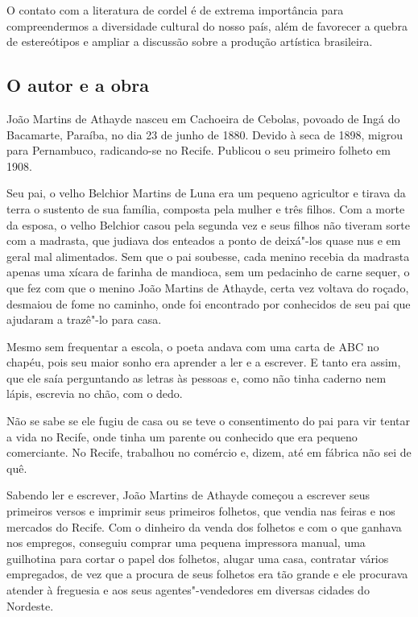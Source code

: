 \documentclass[12pt]{extarticle}
\begin{document}
O contato com a literatura de cordel é de extrema importância para
compreendermos a diversidade cultural do nosso país, além de favorecer a quebra
de estereótipos e ampliar a discussão sobre a produção artística brasileira.


\subsection{O autor e a obra}

João Martins de Athayde nasceu em Cachoeira de Cebolas, povoado de Ingá do
Bacamarte, Paraíba, no dia 23 de junho de 1880. Devido à seca de 1898, migrou
para Pernambuco, radicando-se no Recife. Publicou o seu primeiro folheto em
1908.


Seu pai, o velho Belchior Martins de Luna era um pequeno agricultor e tirava da
terra o sustento de sua família, composta pela mulher e três filhos. Com
a morte da esposa, o velho Belchior casou pela segunda vez e seus filhos não
tiveram sorte com a madrasta, que judiava dos enteados a ponto de deixá"-los
quase nus e em geral mal alimentados. Sem que o pai soubesse, cada menino
recebia da madrasta apenas uma xícara de farinha de mandioca, sem um pedacinho
de carne sequer, o que fez com que o menino João Martins de Athayde, certa vez
voltava do roçado, desmaiou de fome no caminho, onde foi encontrado por
conhecidos de seu pai que ajudaram a trazê"-lo para casa.

Mesmo sem frequentar a escola, o poeta andava com uma carta de ABC no chapéu,
pois seu maior sonho era aprender a ler e a escrever. E tanto era assim, que
ele saía perguntando as letras às pessoas e, como não tinha caderno nem lápis,
escrevia no chão, com o dedo.

Não se sabe se ele fugiu de casa ou se teve o consentimento do pai para vir
tentar a vida no Recife, onde tinha um parente ou conhecido que era pequeno
comerciante. No Recife, trabalhou no comércio e, dizem, até em fábrica não sei
de quê.

Sabendo ler e escrever, João Martins de Athayde começou a escrever seus
primeiros versos e imprimir seus primeiros folhetos, que vendia nas feiras
e nos mercados do Recife. Com o dinheiro da venda dos folhetos e com o que
ganhava nos empregos, conseguiu comprar uma pequena impressora manual, uma
guilhotina para cortar o papel dos folhetos, alugar uma casa, contratar vários
empregados, de vez que a procura de seus folhetos era tão grande e ele
procurava atender à freguesia e aos seus agentes"-vendedores em diversas cidades
do Nordeste.
\end{document}
